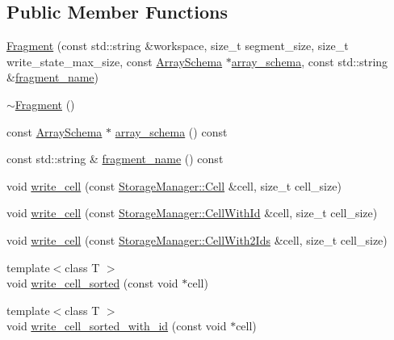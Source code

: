 \subsection*{Public Member Functions}
\begin{DoxyCompactItemize}
\item 
\hyperlink{classStorageManager_1_1Fragment_a48e2456338d3271c094815d3e11f43b5}{Fragment} (const std\+::string \&workspace, size\+\_\+t segment\+\_\+size, size\+\_\+t write\+\_\+state\+\_\+max\+\_\+size, const \hyperlink{classArraySchema}{Array\+Schema} $\ast$\hyperlink{classStorageManager_1_1Fragment_a1d213b136596a6b756b7cd27e3f1b5de}{array\+\_\+schema}, const std\+::string \&\hyperlink{classStorageManager_1_1Fragment_ac0d3522c8b7572b4d378843486e9a81c}{fragment\+\_\+name})
\item 
\hyperlink{classStorageManager_1_1Fragment_ac47c68b3770e0334954620557f021769}{$\sim$\+Fragment} ()
\item 
const \hyperlink{classArraySchema}{Array\+Schema} $\ast$ \hyperlink{classStorageManager_1_1Fragment_a1d213b136596a6b756b7cd27e3f1b5de}{array\+\_\+schema} () const 
\item 
const std\+::string \& \hyperlink{classStorageManager_1_1Fragment_ac0d3522c8b7572b4d378843486e9a81c}{fragment\+\_\+name} () const 
\item 
void \hyperlink{classStorageManager_1_1Fragment_a00c43fd9d6fde012a35fe00e1ea569c4}{write\+\_\+cell} (const \hyperlink{structStorageManager_1_1Cell}{Storage\+Manager\+::\+Cell} \&cell, size\+\_\+t cell\+\_\+size)
\item 
void \hyperlink{classStorageManager_1_1Fragment_a315b1953363fe48f7d488251d3467b36}{write\+\_\+cell} (const \hyperlink{structStorageManager_1_1CellWithId}{Storage\+Manager\+::\+Cell\+With\+Id} \&cell, size\+\_\+t cell\+\_\+size)
\item 
void \hyperlink{classStorageManager_1_1Fragment_a05c91628918a91a39e16e661097f8b27}{write\+\_\+cell} (const \hyperlink{structStorageManager_1_1CellWith2Ids}{Storage\+Manager\+::\+Cell\+With2\+Ids} \&cell, size\+\_\+t cell\+\_\+size)
\item 
{\footnotesize template$<$class T $>$ }\\void \hyperlink{classStorageManager_1_1Fragment_a93c4e22eeeadac8fc485852c4b7cba8d}{write\+\_\+cell\+\_\+sorted} (const void $\ast$cell)
\item 
{\footnotesize template$<$class T $>$ }\\void \hyperlink{classStorageManager_1_1Fragment_ae8ccba2bf546801841600dfbec98fe93}{write\+\_\+cell\+\_\+sorted\+\_\+with\+\_\+id} (const void $\ast$cell)

\end{DoxyCompactItemize}
